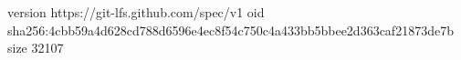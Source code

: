 version https://git-lfs.github.com/spec/v1
oid sha256:4cbb59a4d628cd788d6596e4ec8f54c750c4a433bb5bbee2d363caf21873de7b
size 32107
